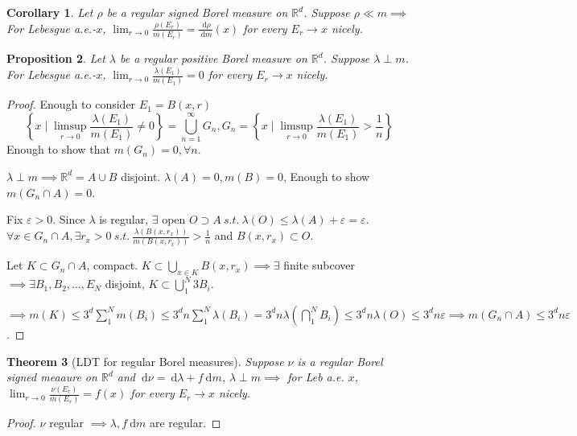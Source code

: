\documentclass{report}
\newcommand{\R}{\mathbb{R}}
\newcommand{\st}{\ s.t.\ }
\newcommand{\df}{\ \mathrm{d}}
\newtheorem{theorem}{Theorem}[chapter]
\newtheorem{corollary}[theorem]{Corollary}
\newtheorem{proposition}[theorem]{Proposition}
\theoremstyle{definition}
\theoremstyle{remark}
\begin{document}
\begin{corollary}
	Let $\rho$ be a \emph{regular} signed Borel measure on $\R^d$. Suppose $\rho \ll m \implies$ For Lebesgue a.e.-$x$, $\lim_{r \to 0}\frac{\rho(E_r)}{m(E_r)} = \frac{\df \rho}{\df m}(x)$ for every $E_r \to x$ nicely. 
\end{corollary}

\begin{proposition}
	Let $\lambda$ be a \emph{regular} positive Borel measure on $\R^d$. Suppose $\lambda \perp m$. For Lebesgue a.e.-$x$, $\lim_{r \to 0}\frac{\lambda(E_1)}{m(E_1)} = 0$ for every $E_r \to x$ nicely.
\end{proposition}
\begin{proof}
	Enough to consider $E_1 = B(x, r)$ 
	\[
		\left\{x \mid \limsup_{r \to 0} \frac{\lambda(E_1)}{m(E_1)} \neq 0\right\} = \bigcup_{n=1}^\infty G_n, G_n = \left\{x \mid \limsup_{r \to 0} \frac{\lambda(E_1)}{m(E_1)} > \frac{1}{n} \right\}
	\]
	Enough to show that $m(G_n) = 0, \forall n$.

	$\lambda \perp m \implies \R^d = A \cup B$ disjoint. $\lambda(A) = 0, m(B) = 0$, Enough to show $m(G_n \cap A) = 0$.

	Fix $\varepsilon > 0$. Since $\lambda$ is regular, $\exists$ open $O \supset A \st \lambda(O) \leq \lambda(A) + \varepsilon = \varepsilon$. $\forall x \in G_n \cap A, \exists r_x > 0 \st \frac{\lambda(B(x, r_x))}{m(B(x, r_x))} > \frac{1}{n}$ and $B(x, r_x) \subset O$.

	Let $K \subset G_n \cap A$, compact. $K \subset \bigcup_{x \in K} B(x, r_x) \implies \exists$ finite subcover $\implies \exists B_1, B_2, \ldots, E_N$ disjoint, $K \subset \bigcup_1^N 3B_i$. 

	$\implies m(K) \leq 3^d \sum_1^N m(B_i) \leq 3^d n \sum_{1}^N \lambda(B_i) = 3^dn\lambda\left(\bigcap_1^N B_i\right) \leq 3^d n \lambda(O) \leq 3^dn\varepsilon \implies m(G_n \cap A) \leq 3^dn\varepsilon$.
\end{proof}

\begin{theorem}[LDT for regular Borel measures] Suppose $\nu$ is a regular Borel signed meaaure on $\R^d$ and $\df \nu = \df \lambda + f \df m$, $\lambda \perp m \implies$ for Leb a.e. $x$, $\lim_{r \to 0} \frac{\nu(E_r)}{m(E_r)} = f(x)$ for every $E_r \to x$ nicely.
\end{theorem}
\begin{proof}
	$\nu$ regular $\implies \lambda, f\df m$ are regular.
\end{proof}
\end{document}

